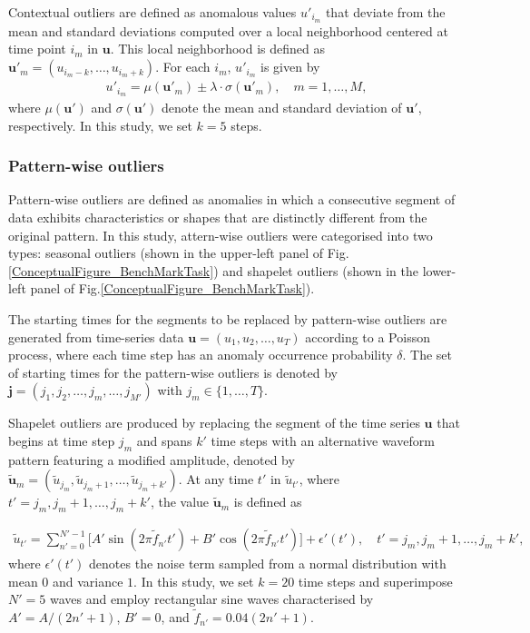 \documentclass[pdflatex,sn-nature]{sn-jnl}
\theoremstyle{thmstyleone}%
\theoremstyle{thmstyletwo}%
\theoremstyle{thmstylethree}%
\begin{document}
Contextual outliers are defined as anomalous values \(u'_{i_m}\) that deviate from the mean and standard deviations computed over a local neighborhood centered at time point \(i_m\) in \(\mathbf{u}\). 
This local neighborhood is defined as \(\mathbf{u}'_m=(u_{i_m-k},\ldots,u_{i_m+k})\). 
For each \(i_m\), \(u'_{i_m}\) is given by
\begin{align}
u'_{i_m} = \mu(\mathbf{u}'_m) \pm \lambda \cdot \sigma(\mathbf{u}'_m), \quad m=1,\dots,M,
\end{align}
where \(\mu(\mathbf{u}')\) and \(\sigma(\mathbf{u}')\) denote the mean and standard deviation of \(\mathbf{u}'\), respectively. 
In this study, we set \(k=5\) steps.

\subsubsection*{Pattern-wise outliers}
Pattern-wise outliers are defined as anomalies in which a consecutive segment of data exhibits characteristics or shapes that are distinctly different from the original pattern. 
In this study, attern-wise outliers were categorised into two types: seasonal outliers (shown in the upper-left panel of Fig.\ref{ConceptualFigure_BenchMarkTask}) and shapelet outliers (shown in the lower-left panel of Fig.\ref{ConceptualFigure_BenchMarkTask}).

The starting times for the segments to be replaced by pattern-wise outliers are generated from time-series data \(\mathbf{u}=(u_{1},u_{2},\dots,u_{T})\) according to a Poisson process, where each time step has an anomaly occurrence probability \(\delta\). 
The set of starting times for the pattern-wise outliers is denoted by \(\mathbf{j}=(j_1,j_2,\dots,j_{m},\dots,j_{M'})\) with \(j_{m}\in \{1,\dots,T\}\).

Shapelet outliers are produced by replacing the segment of the time series \(\mathbf{u}\) that begins at time step \(j_m\) and spans \(k'\) time steps with an alternative waveform pattern featuring a modified amplitude, denoted by \(\tilde{\mathbf{u}}_m=(\tilde{u}_{j_m},\tilde{u}_{j_m+1},\dots,\tilde{u}_{j_m+k'})\). 
At any time \(t'\) in \(\tilde{u}_{t'}\), where \(t'=j_m,j_m+1,\dots,j_m+k'\), the value \(\tilde{\mathbf{u}}_m\) is defined as

\begin{align}
    \tilde{u}_{t'} = \sum_{n'=0}^{N'-1}\Big[A' \sin(2\pi \tilde{f}_{n'}t') + B' \cos(2\pi \tilde{f}_{n'}t')\Big] + \epsilon'(t'),\quad t'=j_m,j_m+1,\dots,j_m+k' ,
\end{align}
where \(\epsilon'(t')\) denotes the noise term sampled from a normal distribution with mean \(0\) and variance \(1\). 
In this study, we set \(k=20\) time steps and superimpose \(N'=5\) waves and employ rectangular sine waves characterised by \(A' = A/(2n'+1)\), \(B'=0\), and \(\tilde{f}_{n'} = 0.04(2n'+1)\).
\end{document}
